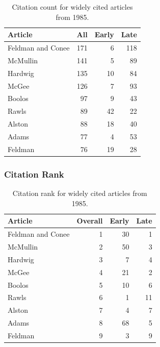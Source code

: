 \documentclass[
  10pt,
  letterpaper,
  DIV=11,
  numbers=noendperiod,
  twoside]{scrartcl}
\begin{document}
\begin{longtable}[]{@{}lrrr@{}}

\caption{\label{tbl-citation-count-1985}Citation count for widely cited
articles from 1985.}

\tabularnewline

\toprule\noalign{}
Article & All & Early & Late \\
\midrule\noalign{}
\endhead
\bottomrule\noalign{}
\endlastfoot
Feldman and Conee & 171 & 6 & 118 \\
McMullin & 141 & 5 & 89 \\
Hardwig & 135 & 10 & 84 \\
McGee & 126 & 7 & 93 \\
Boolos & 97 & 9 & 43 \\
Rawls & 89 & 42 & 22 \\
Alston & 88 & 18 & 40 \\
Adams & 77 & 4 & 53 \\
Feldman & 76 & 19 & 28 \\

\end{longtable}

\subsubsection*{Citation Rank}\label{sec-rank-1985}

\begin{longtable}[]{@{}lrrr@{}}

\caption{\label{tbl-citation-rank-1985}Citation rank for widely cited
articles from 1985.}

\tabularnewline

\toprule\noalign{}
Article & Overall & Early & Late \\
\midrule\noalign{}
\endhead
\bottomrule\noalign{}
\endlastfoot
Feldman and Conee & 1 & 30 & 1 \\
McMullin & 2 & 50 & 3 \\
Hardwig & 3 & 7 & 4 \\
McGee & 4 & 21 & 2 \\
Boolos & 5 & 10 & 6 \\
Rawls & 6 & 1 & 11 \\
Alston & 7 & 4 & 7 \\
Adams & 8 & 68 & 5 \\
Feldman & 9 & 3 & 9 \\

\end{longtable}
\end{document}
